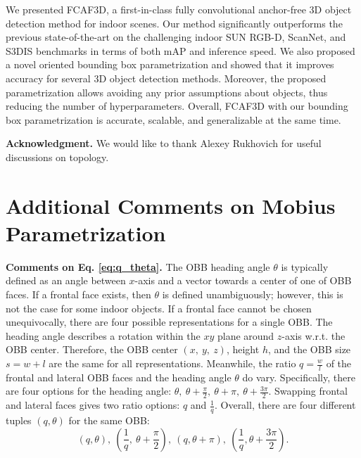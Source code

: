 \documentclass[runningheads]{llncs}
\begin{document}
We presented FCAF3D, a first-in-class fully convolutional anchor-free 3D object detection method for indoor scenes. Our method significantly outperforms the previous state-of-the-art on the challenging indoor SUN RGB-D, ScanNet, and S3DIS benchmarks in terms of both mAP and inference speed. We also proposed a novel oriented bounding box parametrization and showed that it improves accuracy for several 3D object detection methods. Moreover, the proposed parametrization allows avoiding any prior assumptions about objects, thus reducing the number of hyperparameters. Overall, FCAF3D with our bounding box parametrization is accurate, scalable, and generalizable at the same time. 

\textbf{Acknowledgment.} We would like to thank Alexey Rukhovich for useful discussions on topology.





\appendix

\section{Additional Comments on Mobius Parametrization}

\textbf{Comments on Eq. \ref{eq:q_theta}.}
The OBB heading angle $\theta$ is typically defined as an angle between $x$-axis and a vector towards a center of one of OBB faces. If a frontal face exists, then $\theta$ is defined unambiguously; however, this is not the case for some indoor objects. If a frontal face cannot be chosen unequivocally, there are four possible representations for a single OBB. The heading angle describes a rotation within the $xy$ plane around $z$-axis w.r.t. the OBB center. Therefore, the OBB center $(x,\ y,\ z)$, height $h$, and the OBB size $s=w+l$ are the same for all representations. Meanwhile, the ratio $q=\frac{w}{l}$ of the frontal and lateral OBB faces and the heading angle $\theta$ do vary. Specifically, there are four options for the heading angle: $\theta,\ \theta + \frac{\pi}{2},\ \theta + \pi,\ \theta + \frac{3\pi}{2}$. Swapping frontal and lateral faces gives two ratio options: $q$ and $\frac{1}{q}$. Overall, there are four different tuples $(q, \theta)$ for the same OBB:
\begin{equation*}
    \left(q, \theta \right),\ \left(\frac{1}{q},\ \theta+\frac{\pi}{2} \right),\ \left( q, \theta+\pi \right),\ \left(\frac{1}{q}, \theta+\frac{3\pi}{2} \right).
\end{equation*}
\end{document}
